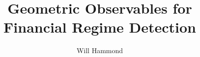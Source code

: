 \documentclass[3p]{elsarticle}
\newif\ifanonymous
\begin{document}
\begin{frontmatter}

\title{Geometric Observables for Financial Regime Detection}

\ifanonymous
  \author{Anonymous Author}
\else
  \author[pitzer]{Will Hammond}
\fi



\end{frontmatter}
\end{document}
